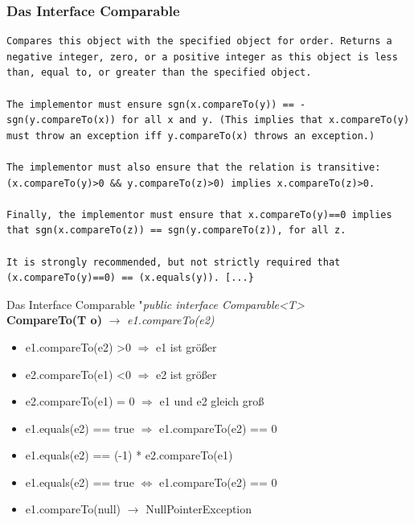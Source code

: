 \documentclass[18pt]{beamer}
\begin{document}

\begin{frame}[containsverbatim]
	\frametitle{Das Interface Comparable}

	\begin{lstlisting}	
Compares this object with the specified object for order. Returns a negative integer, zero, or a positive integer as this object is less than, equal to, or greater than the specified object.

The implementor must ensure sgn(x.compareTo(y)) == -sgn(y.compareTo(x)) for all x and y. (This implies that x.compareTo(y) must throw an exception iff y.compareTo(x) throws an exception.)

The implementor must also ensure that the relation is transitive: (x.compareTo(y)>0 && y.compareTo(z)>0) implies x.compareTo(z)>0.

Finally, the implementor must ensure that x.compareTo(y)==0 implies that sgn(x.compareTo(z)) == sgn(y.compareTo(z)), for all z.

It is strongly recommended, but not strictly required that (x.compareTo(y)==0) == (x.equals(y)). [...}
	\end{lstlisting}
\end{frame}


\begin{frame}{Das Interface Comparable}
	"\emph{public interface Comparable<T>}\\
	\textbf{CompareTo(T o)} $\rightarrow$ \emph{e1.compareTo(e2)}\\
	\begin{itemize}
		\item e1.compareTo(e2) \textgreater 0 $\Rightarrow$ e1 ist größer
		\item e2.compareTo(e1) \textless 0 $\Rightarrow$ e2 ist größer
		\item e2.compareTo(e1) = 0 $\Rightarrow$ e1 und e2 gleich groß\pause
		\item e1.equals(e2) == true $\Rightarrow$ e1.compareTo(e2) == 0
		\item e1.equals(e2) == (-1) * e2.compareTo(e1)
		\item e1.equals(e2) == true $\Longleftrightarrow$ e1.compareTo(e2) == 0\pause
		\item e1.compareTo(null) $\rightarrow$ NullPointerException 
	\end{itemize}
\end{frame}
\end{document}
